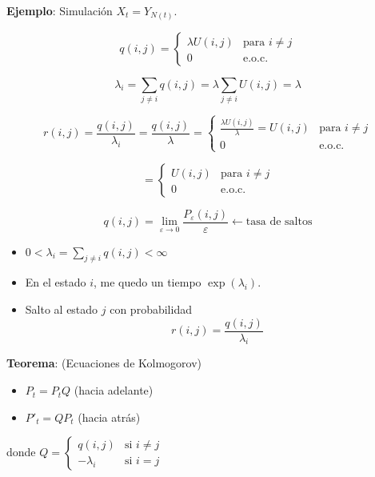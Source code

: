 \documentclass[12pt,a4paper]{article}
\newcommand{\teorema}[1]{%
\begin{teoremabox}
\textbf{Teorema}: #1
\end{teoremabox}
}
\begin{document}
\textbf{Ejemplo}: Simulación $X_t = Y_{N(t)}$.

\begin{equation*}
q(i,j) = \begin{cases}
\lambda U(i,j) & \text{para } i \neq j \\
0 & \text{e.o.c.}
\end{cases}
\end{equation*}

\begin{equation*}
\lambda_i = \sum_{j \neq i} q(i,j) = \lambda \sum_{j \neq i} U(i,j) = \lambda
\end{equation*}

\begin{equation*}
r(i,j) = \frac{q(i,j)}{\lambda_i} = \frac{q(i,j)}{\lambda} = \begin{cases}
\frac{\lambda U(i,j)}{\lambda} = U(i,j) & \text{para } i \neq j \\
0 & \text{e.o.c.}
\end{cases}
\end{equation*}

\begin{equation*}
= \begin{cases}
U(i,j) & \text{para } i \neq j \\
0 & \text{e.o.c.}
\end{cases}
\end{equation*}


\begin{equation*}
q(i,j) = \lim_{\varepsilon \to 0} \frac{P_\varepsilon(i,j)}{\varepsilon} \leftarrow \text{tasa de saltos}
\end{equation*}

\begin{itemize}
    \item $0 < \lambda_i = \sum_{j \neq i} q(i,j) < \infty$
    \item En el estado $i$, me quedo un tiempo $\exp(\lambda_i)$.
    \item Salto al estado $j$ con probabilidad
    \begin{equation*}
    r(i,j) = \frac{q(i,j)}{\lambda_i}
    \end{equation*}
\end{itemize}


\teorema{(Ecuaciones de Kolmogorov)
\begin{itemize}
    \item $P_t = P_t Q$ \quad (hacia adelante)
    \item $P'_t = Q P_t$ \quad (hacia atrás)
\end{itemize}
donde $Q = \begin{cases}
q(i,j) & \text{si } i \neq j \\
-\lambda_i & \text{si } i = j
\end{cases}$
}
\end{document}
